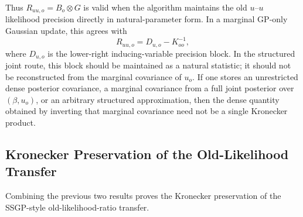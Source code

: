 \documentclass[12pt]{article}
\begin{document}
Thus \(R_{uu,o}=B_o\otimes G\) is valid when the algorithm maintains the old
$u$--$u$ likelihood precision directly in natural-parameter form. In a
marginal GP-only Gaussian update, this agrees with
\begin{equation}
    R_{uu,o}=D_{u,o}-K_{oo}^{-1},
\end{equation}
where \(D_{u,o}\) is the lower-right inducing-variable precision block.
In the structured joint route, this block should be maintained as a
natural statistic; it should not be reconstructed from the marginal
covariance of \(u_o\). If one stores an unrestricted dense posterior
covariance, a marginal covariance from a full joint posterior over
\((\beta,u_o)\), or an arbitrary structured approximation, then the dense
quantity obtained by inverting that marginal covariance need not be a
single Kronecker product.

\subsection{Kronecker Preservation of the Old-Likelihood Transfer}
\label{app:proof_Lambda_transfer_kron}

Combining the previous two results proves the Kronecker preservation of
the SSGP-style old-likelihood-ratio transfer.
\end{document}
